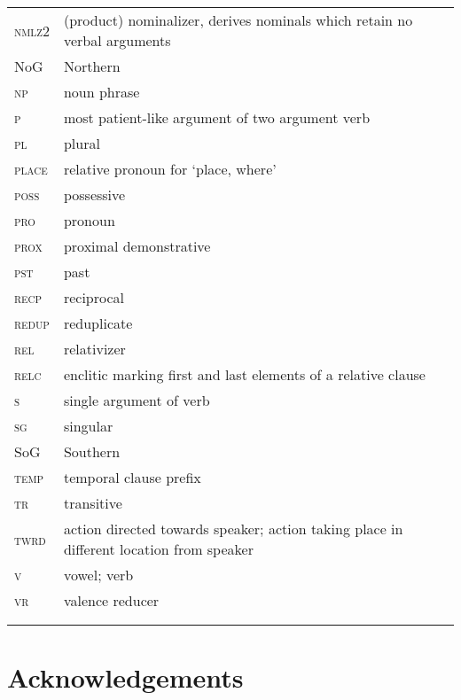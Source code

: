 \documentclass[output=paper]{langsci/langscibook}
\begin{document}
\begin{tabularx}{.48\textwidth}{lQ}
\textsc{nmlz2 }  &  (product) nominalizer, derives nominals which retain no verbal arguments \\
NoG  &  Northern  \\
\textsc{np}  &  noun phrase \\
\textsc{p}  &  most patient-like argument of two argument verb \\
\textsc{pl}   & plural \\
\textsc{place}  &  relative pronoun for 
‘place, where’ \\
\textsc{poss}  &  possessive \\
\textsc{pro}  &  pronoun \\
\textsc{prox}  &  proximal 
demonstrative \\
\textsc{pst}  &  past \\
\textsc{recp}  &  reciprocal \\
\textsc{redup}  &  reduplicate\\
\textsc{rel}  &  relativizer \\
\textsc{relc} & enclitic marking first and last elements of a relative clause \\
\textsc{s}  &   single argument of verb \\
\textsc{sg}  &  singular \\
SoG & Southern  \\
\textsc{temp}  &  temporal clause prefix \\
\textsc{tr}  &   transitive \\
\textsc{twrd}  & action directed towards speaker; action taking place in different location from speaker \\
\textsc{v} & vowel; verb \\
\textsc{vr} &  valence reducer \\ 
\\
\\
\end{tabularx}

\section*{Acknowledgements}
\end{document}
